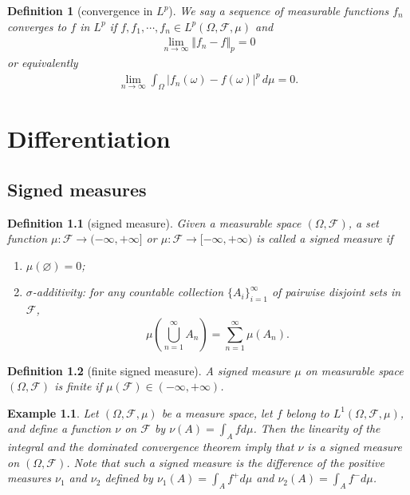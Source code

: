 \documentclass{report}
\newtheorem{definition}{Definition}[section]
\newtheorem{example}{Example}[section]
\theoremstyle{nonumberplain}
\begin{document}
\begin{definition}[convergence in $L^p$]
	We say a sequence of measurable functions $f_n$ converges to $f$ in $L^p$ if $f,f_1,\cdots,f_n\in L^p(\Omega, \mathcal{F}, \mu)$ and
	\begin{align*}
		\lim_{n\to\infty}\Vert f_n-f\Vert_p=0
	\end{align*}
	or equivalently
	\begin{align*}
		\lim_{n\to\infty}\int_{\Omega}|f_n(\omega)-f(\omega)|^p\,d\mu=0.
	\end{align*}
\end{definition}

\chapter{Differentiation}

\section{Signed measures}

\begin{definition}[signed measure]
	Given a measurable space $(\Omega, \mathcal{F})$, a set function $\mu:\mathcal{F}\to(-\infty,+\infty]$ or $\mu:\mathcal{F}\to[-\infty,+\infty)$ is called a \emph{signed measure} if
	\begin{enumerate}
		\item[(a)]$\mu(\varnothing) = 0$;
		\item[(b)]$\sigma$-additivity: for any countable collection $\{A_{i}\}_{i=1}^{\infty }$ of pairwise disjoint sets in $\mathcal{F}$,
		\[
		\mu\left(\bigcup_{n=1}^\infty A_n\right)=\sum_{n=1}^{\infty}\mu(A_n).
		\]
	\end{enumerate}
\end{definition}

\begin{definition}[finite signed measure]
	A signed measure $\mu$ on measurable space $(\Omega, \mathcal{F})$ is \emph{finite} if $\mu(\mathcal{F})\in(-\infty,+\infty)$.
\end{definition}

\begin{example}
	Let $(\Omega, \mathcal{F}, \mu)$ be a measure space, let $f$ belong to $L^{1}(\Omega, \mathcal{F},\mu)$, and define a function $\nu$ on $\mathcal{F}$ by $\nu(A)=\int_{A} f d \mu$. Then the linearity of the integral and the dominated convergence theorem imply that $\nu$ is a signed measure on $(\Omega, \mathcal{F})$. Note that such a signed measure is the difference of the positive measures $\nu_{1}$ and $\nu_{2}$ defined by $\nu_{1}(A)=\int_{A} f^{+} d \mu$ and $\nu_{2}(A)=\int_{A} f^{-} d \mu$.
\end{example}
\end{document}

